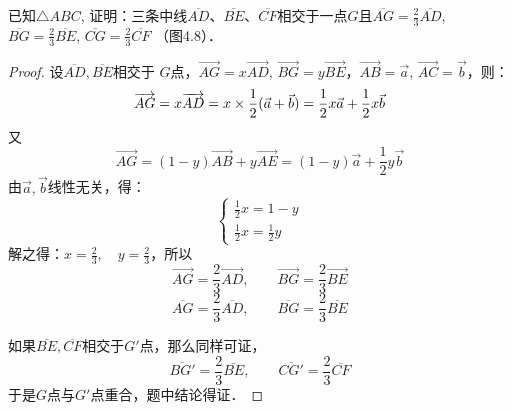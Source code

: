 \begin{figure}[htp]\centering
    \begin{minipage}[t]{0.48\textwidth}
    \centering
{}
    \caption{}
    \end{minipage}
    \begin{minipage}[t]{0.48\textwidth}
    \centering
    \caption{}
    \end{minipage}
    \end{figure}


\begin{example}
    已知$\triangle ABC$, 证明：三条中线$\overline{AD}$、$\overline{BE}$、$\overline{CF}$相交于一点$G$且$\overline{AG}=\frac{2}{3} \overline{AD}$, $\overline{BG}=\frac{2}{3}\overline{BE}$, $\overline{CG}=\frac{2}{3}\overline{CF}$ （图4.8）．
\end{example}

\begin{proof}
    设$\overline{AD},\overline{BE}$相交于
    $G$点，$\Vec{AG}=x\Vec{AD}$, $\Vec{BG}=y\Vec{BE}$，$\Vec{AB}=\vec{a}$, $\Vec{AC}=\vec{b}$，则：
\[\overrightarrow{AG}=x\overrightarrow{AD}=x\times \dfrac{1}{2}(\vec{a}+\vec{b})=\dfrac{1}{2}x\vec{a}+\dfrac{1}{2}x\vec{b}\]
又    
\[\Vec{AG}=(1-y)\Vec{AB}+y\Vec{AE}=(1-y)\vec{a}+\frac{1}{2}y\vec{b}\]
由$\vec{a},\vec{b}$线性无关，得：
\[\begin{cases}
    \frac{1}{2}x=1-y\\
    \frac{1}{2}x=\frac{1}{2}y
\end{cases}\]
解之得：$x=\frac{2}{3},\quad y=\frac{2}{3}$，所以
\[\Vec{AG}=\frac{2}{3}\Vec{AD},\qquad \Vec{BG}=\frac{2}{3}\Vec{BE}\]
\[\overline{AG}=\frac{2}{3}\overline{AD},\qquad \overline{BG}=\frac{2}{3}\overline{BE}\]

如果$\overline{BE},\overline{CF}$相交于$G'$点，那么同样可证，
\[\overline{BG'}=\frac{2}{3} \overline{BE},\qquad \overline{CG'}=\frac{2}{3}\overline{CF}\]
于是$G$点与$G'$点重合，题中结论得证．
\end{proof}

